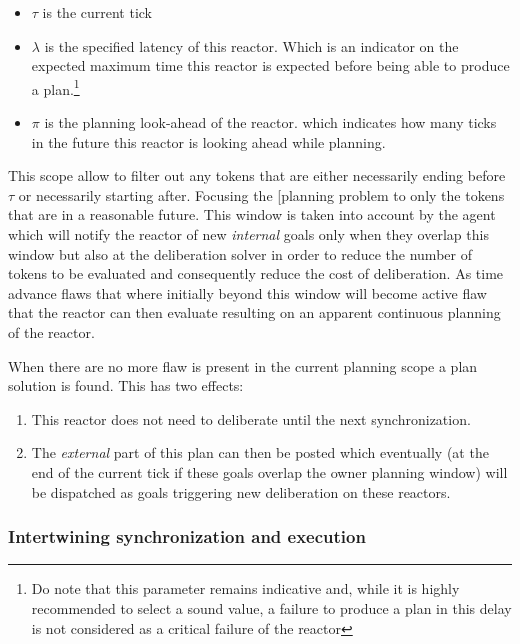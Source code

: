\begin{itemize}

\item $\tau$ is the current tick

\item $\lambda$ is the specified latency of this reactor. Which is an
  indicator on the expected maximum time this reactor is expected
  before being able to produce a plan.\footnote{Do note that this
    parameter remains indicative and, while it is highly recommended
    to select a sound value, a failure to produce a plan in this delay
    is not considered as a critical failure of the reactor}

\item $\pi$ is the planning look-ahead of the reactor. which indicates
  how many ticks in the future this reactor is looking ahead while planning.

\end{itemize}

This scope allow to filter out any tokens that are either necessarily
ending before $\tau$ or necessarily starting after. Focusing the
[planning problem to only the tokens that are in a reasonable
future. This window is taken into account by the agent which will
notify the reactor of new {\em internal} goals only when they overlap
this window but also at the deliberation solver in order to reduce the
number of tokens to be evaluated and consequently reduce the cost of
deliberation. As time advance flaws that where initially beyond this
window will become active flaw that the reactor can then evaluate
resulting on an apparent continuous planning of the reactor.

When there are no more flaw is present in the current planning scope a
plan solution is found. This has two effects:

\begin{enumerate}

\item This reactor does not need to deliberate until the next synchronization.

\item The {\em external} part of this plan can then be posted which
  eventually (at the end of the current tick if these goals overlap
  the owner planning window) will be dispatched as goals triggering
  new deliberation on these reactors.

\end{enumerate}

\subsubsection{Intertwining synchronization and execution}
\label{sec:arch:intertwine}

